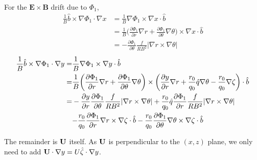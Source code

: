 \documentclass[12pt]{article}
\begin{document}
\begin{CJK*}{UTF8}{gbsn}
For the $\mathbf{E\times B}$ drift due to $\Phi_1$,
\begin{equation}
    \begin{split}
        \frac{1}{B}\hat{b}\times\nabla\Phi_1\cdot\nabla x &= \frac{1}{B}\nabla\Phi_1\times\nabla x\cdot\hat{b}\\
        &= \frac{1}{B}\bigg(\frac{\partial\Phi_1}{\partial r}\nabla r + \frac{\partial\Phi_1}{\partial \theta}\nabla \theta\bigg)\times\nabla x \cdot \hat{b}\\
        &= - \frac{\partial\Phi_1}{\partial \theta}\frac{f}{RB^2}|\nabla r\times\nabla \theta|
    \end{split}
\end{equation}
\begin{equation}
    \begin{split}
        \frac{1}{B}\hat{b}\times\nabla\Phi_1\cdot\nabla y =& \frac{1}{B}\nabla\Phi_1\times\nabla y\cdot\hat{b}\\
        =& \frac{1}{B}\bigg(\frac{\partial\Phi_1}{\partial r}\nabla r + \frac{\partial\Phi_1}{\partial \theta}\nabla \theta\bigg)\times\bigg(\frac{\partial y}{\partial r} \nabla r + \frac{r_0}{q_0} \hat{q} \nabla \theta - \frac{r_0}{q_0} \nabla \zeta\bigg) \cdot \hat{b}\\
        =& - \frac{\partial y}{\partial r}\frac{\partial\Phi_1}{\partial \theta}\frac{f}{RB^2}|\nabla r\times\nabla \theta| + \frac{r_0}{q_0}\hat{q}\frac{\partial\Phi_1}{\partial r}\frac{f}{RB^2}|\nabla r\times\nabla \theta|\\
         &{\color{black}- \frac{r_0}{q_0}\frac{\partial\Phi_1}{\partial r}\nabla r\times\nabla\zeta\cdot\hat{b} - \frac{r_0}{q_0}\frac{\partial\Phi_1}{\partial \theta}\nabla\theta\times\nabla\zeta\cdot\hat{b}}
    \end{split}
\end{equation}

The remainder is $\bf U$ itself. As $\bf U$ is perpendicular to the $(x,z)$ plane, we only need to add
${\bf U}\cdot\nabla y = U\hat{\zeta}\cdot\nabla y$.
  

\newpage

\end{CJK*}
\end{document}
